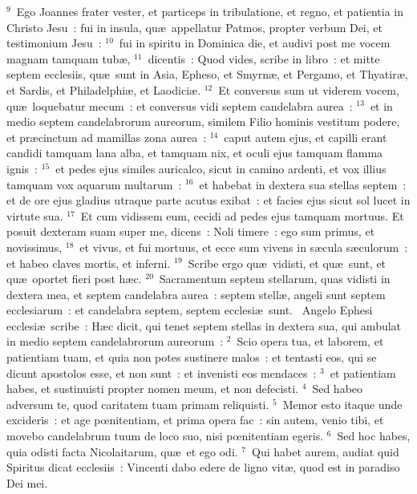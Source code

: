 ${}^{9}$~Ego Joannes frater vester, et particeps in tribulatione, et regno, et patientia in Christo Jesu~: fui in insula, qu\ae\ appellatur Patmos, propter verbum Dei, et testimonium Jesu~:
${}^{10}$~fui in spiritu in Dominica die, et audivi post me vocem magnam tamquam tub\ae ,
${}^{11}$~dicentis~: Quod vides, scribe in libro~: et mitte septem ecclesiis, qu\ae\ sunt in Asia, Epheso, et Smyrn\ae , et Pergamo, et Thyatir\ae , et Sardis, et Philadelphi\ae , et Laodici\ae .
${}^{12}$~Et conversus sum ut viderem vocem, qu\ae\ loquebatur mecum~: et conversus vidi septem candelabra aurea~:
${}^{13}$~et in medio septem candelabrorum aureorum, similem Filio hominis vestitum podere, et pr\ae cinctum ad mamillas zona aurea~:
${}^{14}$~caput autem ejus, et capilli erant candidi tamquam lana alba, et tamquam nix, et oculi ejus tamquam flamma ignis~:
${}^{15}$~et pedes ejus similes auricalco, sicut in camino ardenti, et vox illius tamquam vox aquarum multarum~:
${}^{16}$~et habebat in dextera sua stellas septem~: et de ore ejus gladius utraque parte acutus exibat~: et facies ejus sicut sol lucet in virtute sua.
${}^{17}$~Et cum vidissem eum, cecidi ad pedes ejus tamquam mortuus. Et posuit dexteram suam super me, dicens~: Noli timere~: ego sum primus, et novissimus,
${}^{18}$~et vivus, et fui mortuus, et ecce sum vivens in s\ae cula s\ae culorum~: et habeo claves mortis, et inferni.
${}^{19}$~Scribe ergo qu\ae\ vidisti, et qu\ae\ sunt, et qu\ae\ oportet fieri post h\ae c.
${}^{20}$~Sacramentum septem stellarum, quas vidisti in dextera mea, et septem candelabra aurea~: septem stell\ae , angeli sunt septem ecclesiarum~: et candelabra septem, septem ecclesi\ae\ sunt.
~Angelo Ephesi ecclesi\ae\ scribe~: H\ae c dicit, qui tenet septem stellas in dextera sua, qui ambulat in medio septem candelabrorum aureorum~:
${}^{2}$~Scio opera tua, et laborem, et patientiam tuam, et quia non potes sustinere malos~: et tentasti eos, qui se dicunt apostolos esse, et non sunt~: et invenisti eos mendaces~:
${}^{3}$~et patientiam habes, et sustinuisti propter nomen meum, et non defecisti.
${}^{4}$~Sed habeo adversum te, quod caritatem tuam primam reliquisti.
${}^{5}$~Memor esto itaque unde excideris~: et age pœnitentiam, et prima opera fac~: sin autem, venio tibi, et movebo candelabrum tuum de loco suo, nisi pœnitentiam egeris.
${}^{6}$~Sed hoc habes, quia odisti facta Nicolaitarum, qu\ae\ et ego odi.
${}^{7}$~Qui habet aurem, audiat quid Spiritus dicat ecclesiis~: Vincenti dabo edere de ligno vit\ae , quod est in paradiso Dei mei.


